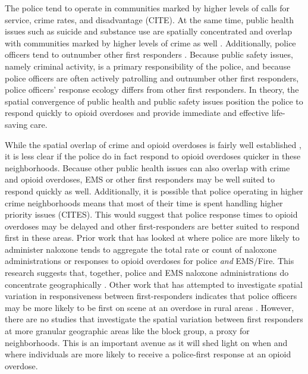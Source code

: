 The police tend to operate in communities marked by higher levels of calls for service, crime rates, and disadvantage (CITE). At the same time, public health issues such as suicide and substance use are spatially concentrated and overlap with communities marked by higher levels of crime as well \parencite{feldmeyer_community_2022, hibdon_use_2024}. Additionally, police officers tend to outnumber other first responders \parencite{lurigio_opioid_2018}. Because public safety issues, namely criminal activity, is a primary responsibility of the police, and because police officers are often actively patrolling and outnumber other first responders, police officers' response ecology differs from other first responders. In theory, the spatial convergence of public health and public safety issues position the police to respond quickly to opioid overdoses and provide immediate and effective life-saving care.

While the spatial overlap of crime and opioid overdoses is fairly well established \parencite{carter_spatial_2019, magee_dual_2022}, it is less clear if the police do in fact respond to opioid overdoses quicker in these neighborhoods. Because other public health issues can also overlap with crime and opioid overdoses, EMS or other first responders may be well suited to respond quickly as well. Additionally, it is possible that police operating in higher crime neighborhoods means that most of their time is spent handling higher priority issues (CITES). This would suggest that police response times to opioid overdoses may be delayed and other first-responders are better suited to respond first in these areas. Prior work that has looked at where police are more likely to administer naloxone tends to aggregate the total rate or count of naloxone administrations or responses to opioid overdoses for police \textit{and} EMS/Fire. This research suggests that, together, police and EMS naloxone administrations do concentrate geographically \parencite{heavey_descriptive_2018}. Other work that has attempted to investigate spatial variation in responsiveness between first-responders indicates that police officers may be more likely to be first on scene at an overdose in rural areas \parencite{wood_overdose_2021}. However, there are no studies that investigate the spatial variation between first responders at more granular geographic areas like the block group, a proxy for neighborhoods. This is an important avenue as it will shed light on when and where individuals are more likely to receive a police-first response at an opioid overdose.

